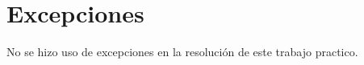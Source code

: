 \documentclass[titlepage,a4paper]{article}
\begin{document}
\section{Excepciones}\label{sec:excepciones}

No se hizo uso de excepciones en la resolución de este trabajo practico.
\end{document}
